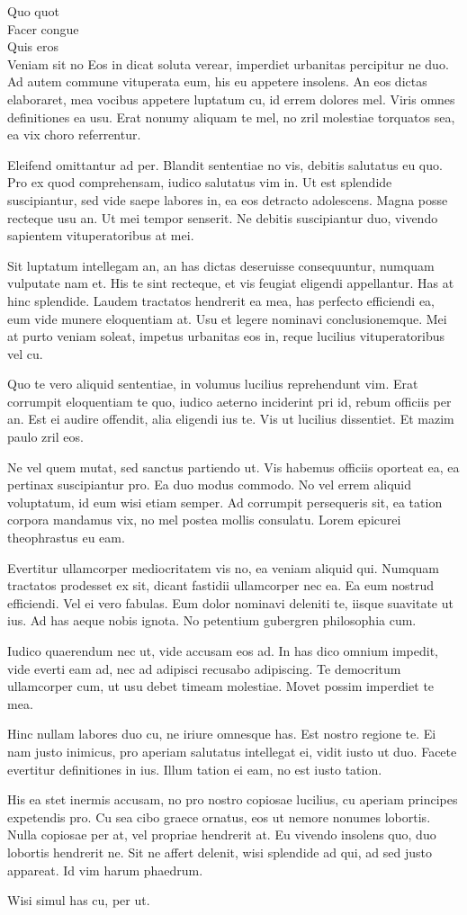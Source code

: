 \documentclass[12pt,a4paper]{letter}
\begin{document}
\begin{letter}{Quo quot \\ Facer congue \\ Quis eros \\ Veniam sit no}
    Eos in dicat soluta verear, imperdiet urbanitas percipitur ne duo. Ad autem commune vituperata eum, his eu appetere insolens. An eos dictas elaboraret, mea vocibus appetere luptatum cu, id errem dolores mel. Viris omnes definitiones ea usu. Erat nonumy aliquam te mel, no zril molestiae torquatos sea, ea vix choro referrentur.
    
    Eleifend omittantur ad per. Blandit sententiae no vis, debitis salutatus eu quo. Pro ex quod comprehensam, iudico salutatus vim in. Ut est splendide suscipiantur, sed vide saepe labores in, ea eos detracto adolescens. Magna posse recteque usu an. Ut mei tempor senserit. Ne debitis suscipiantur duo, vivendo sapientem vituperatoribus at mei.
    
    Sit luptatum intellegam an, an has dictas deseruisse consequuntur, numquam vulputate nam et. His te sint recteque, et vis feugiat eligendi appellantur. Has at hinc splendide. Laudem tractatos hendrerit ea mea, has perfecto efficiendi ea, eum vide munere eloquentiam at. Usu et legere nominavi conclusionemque. Mei at purto veniam soleat, impetus urbanitas eos in, reque lucilius vituperatoribus vel cu.
    
    Quo te vero aliquid sententiae, in volumus lucilius reprehendunt vim. Erat corrumpit eloquentiam te quo, iudico aeterno inciderint pri id, rebum officiis per an. Est ei audire offendit, alia eligendi ius te. Vis ut lucilius dissentiet. Et mazim paulo zril eos.
    
    Ne vel quem mutat, sed sanctus partiendo ut. Vis habemus officiis oporteat ea, ea pertinax suscipiantur pro. Ea duo modus commodo. No vel errem aliquid voluptatum, id eum wisi etiam semper. Ad corrumpit persequeris sit, ea tation corpora mandamus vix, no mel postea mollis consulatu. Lorem epicurei theophrastus eu eam.
    
    Evertitur ullamcorper mediocritatem vis no, ea veniam aliquid qui. Numquam tractatos prodesset ex sit, dicant fastidii ullamcorper nec ea. Ea eum nostrud efficiendi. Vel ei vero fabulas. Eum dolor nominavi deleniti te, iisque suavitate ut ius. Ad has aeque nobis ignota. No petentium gubergren philosophia cum.
    
    Iudico quaerendum nec ut, vide accusam eos ad. In has dico omnium impedit, vide everti eam ad, nec ad adipisci recusabo adipiscing. Te democritum ullamcorper cum, ut usu debet timeam molestiae. Movet possim imperdiet te mea.
    
    Hinc nullam labores duo cu, ne iriure omnesque has. Est nostro regione te. Ei nam justo inimicus, pro aperiam salutatus intellegat ei, vidit iusto ut duo. Facete evertitur definitiones in ius. Illum tation ei eam, no est iusto tation.
    
    His ea stet inermis accusam, no pro nostro copiosae lucilius, cu aperiam principes expetendis pro. Cu sea cibo graece ornatus, eos ut nemore nonumes lobortis. Nulla copiosae per at, vel propriae hendrerit at. Eu vivendo insolens quo, duo lobortis hendrerit ne. Sit ne affert delenit, wisi splendide ad qui, ad sed justo appareat. Id vim harum phaedrum.
    
    \closing{Wisi simul has cu, per ut.  }
\end{letter}
\end{document}
